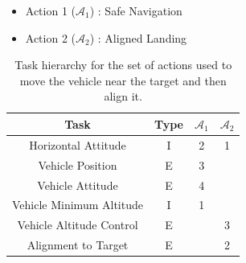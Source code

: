 \documentclass{article}
\begin{document}
\begin{table}[htb]
	\caption{Task hierarchy for the set of actions used to move the vehicle near the target and then align it.}
	\begin{itemize}
		\item Action 1 ($\mathcal{A}_{1}$) : Safe Navigation
		\item Action 2 ($\mathcal{A}_{2}$) : Aligned Landing
	\end{itemize}
	\label{tb_align:actions_table}
	\begin{center}
		\footnotesize
		\begin{tabular}{cccc}
			\toprule
			Task & Type & $\mathcal{A}_{1}$ & $\mathcal{A}_{2}$ \\
			\midrule
			Horizontal Attitude             & I & 2 & 1 \\
			\hdashline
			Vehicle Position				& E & 3 &   \\
			\hdashline
			Vehicle Attitude                & E & 4 &   \\
			\hdashline
			Vehicle Minimum Altitude        & I & 1 &   \\
			\hdashline
			Vehicle Altitude Control        & E &   & 3 \\
			\hdashline
			Alignment to Target             & E &   & 2 \\
			
			\bottomrule
		\end{tabular}
	\end{center}
\end{table}%
\end{document}
